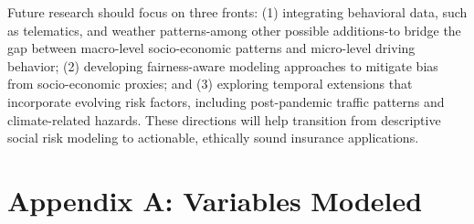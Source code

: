 \documentclass[
  number,
  review,
  3p]{elsarticle}
\begin{document}
Future research should focus on three fronts: (1) integrating behavioral
data, such as telematics, and weather patterns-among other possible
additions-to bridge the gap between macro-level socio-economic patterns
and micro-level driving behavior; (2) developing fairness-aware modeling
approaches to mitigate bias from socio-economic proxies; and (3)
exploring temporal extensions that incorporate evolving risk factors,
including post-pandemic traffic patterns and climate-related hazards.
These directions will help transition from descriptive social risk
modeling to actionable, ethically sound insurance applications.

\section{Appendix A: Variables Modeled}\label{sec-appA}
\end{document}
